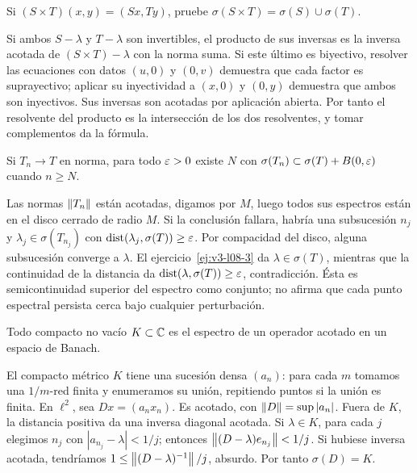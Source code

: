 \begin{ejercicio}\label{ej:v3-l08-5}
Si $(S\times T)(x,y)=(Sx,Ty)$, pruebe $\sigma(S\times T)=\sigma(S)\cup\sigma(T)$.
\end{ejercicio}
\begin{solucion}
Si ambos $S-\lambda$ y $T-\lambda$ son invertibles, el producto de sus inversas es la inversa acotada de $(S\times T)-\lambda$ con la norma suma. Si este último es biyectivo, resolver las ecuaciones con datos $(u,0)$ y $(0,v)$ demuestra que cada factor es suprayectivo; aplicar su inyectividad a $(x,0)$ y $(0,y)$ demuestra que ambos son inyectivos. Sus inversas son acotadas por aplicación abierta. Por tanto el resolvente del producto es la intersección de los dos resolventes, y tomar complementos da la fórmula.
\end{solucion}

\begin{ejercicio}\label{ej:v3-l08-6}
Si $T_n\to T$ en norma, para todo $\varepsilon>0$ existe $N$ con $\sigma(T_n)\subset\sigma(T)+B(0,\varepsilon)$ cuando $n\ge N$.
\end{ejercicio}
\begin{solucion}
Las normas $\left\lVert T_n\right\rVert$ están acotadas, digamos por $M$, luego todos sus espectros están en el disco cerrado de radio $M$. Si la conclusión fallara, habría una subsucesión $n_j$ y $\lambda_j\in\sigma(T_{n_j})$ con $\operatorname{dist}(\lambda_j,\sigma(T))\ge\varepsilon$. Por compacidad del disco, alguna subsucesión converge a $\lambda$. El ejercicio~\ref{ej:v3-l08-3} da $\lambda\in\sigma(T)$, mientras que la continuidad de la distancia da $\operatorname{dist}(\lambda,\sigma(T))\ge\varepsilon$, contradicción. Ésta es semicontinuidad superior del espectro como conjunto; no afirma que cada punto espectral persista cerca bajo cualquier perturbación.
\end{solucion}

\begin{ejercicio}\label{ej:v3-l08-7}
Todo compacto no vacío $K\subset\mathbb C$ es el espectro de un operador acotado en un espacio de Banach.
\end{ejercicio}
\begin{solucion}
El compacto métrico $K$ tiene una sucesión densa $(a_n)$: para cada $m$ tomamos una $1/m$-red finita y enumeramos su unión, repitiendo puntos si la unión es finita. En $\ell^2$, sea $Dx=(a_nx_n)$. Es acotado, con $\left\lVert D\right\rVert=\sup|a_n|$. Fuera de $K$, la distancia positiva da una inversa diagonal acotada. Si $\lambda\in K$, para cada $j$ elegimos $n_j$ con $|a_{n_j}-\lambda|<1/j$; entonces $\left\lVert(D-\lambda)e_{n_j}\right\rVert<1/j$. Si hubiese inversa acotada, tendríamos $1\le\left\lVert(D-\lambda)^{-1}\right\rVert/j$, absurdo. Por tanto $\sigma(D)=K$.
\end{solucion}

